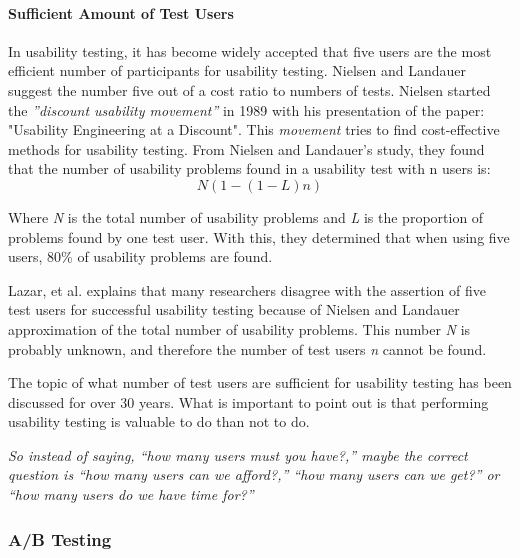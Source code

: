 \paragraph{Sufficient Amount of Test Users}
\label{ssub:Sufficient Amount of Test Users}

In usability testing, it has become widely accepted that five users are the most efficient number of participants for usability testing.  Nielsen and Landauer suggest the number five out of a cost ratio to numbers of tests\cite{nielsen1993mathematical}. Nielsen started the \textit{''discount usability movement''} in 1989 with his presentation of the paper: "Usability Engineering at a Discount"\cite{experienceDiscountUsability20}. This \textit{movement} tries to find cost-effective methods for usability testing. 
From Nielsen and Landauer's study, they found that the number of usability problems found in a usability test with n users is:
\[ N (1-(1- L ) n ) \]

Where \textit{N} is the total number of usability problems and  \textit{L} is the proportion of problems found by one test user. With this, they determined that when using five users, 80\% of usability problems are found.

Lazar, et al. explains that many researchers disagree with the assertion of five test users for successful usability testing because of Nielsen and Landauer approximation of the total number of usability problems\cite[Chapter~10.5.3]{lazar2017research}. This number \textit{N} is probably unknown, and therefore the number of test users \textit{n} cannot be found.

The topic of what number of test users are sufficient for usability testing has been discussed for over 30 years. What is important to point out is that performing usability testing is valuable to do than not to do. 


\textit{
So instead of saying, “how many users must you have?,” maybe the correct question is “how many users can we afford?,” “how many users can we get?” or “how many users do we have time for?”
} \cite{lazar2017research} 








\subsubsection{A/B Testing}%
\label{sub:A/B Testing}
 
